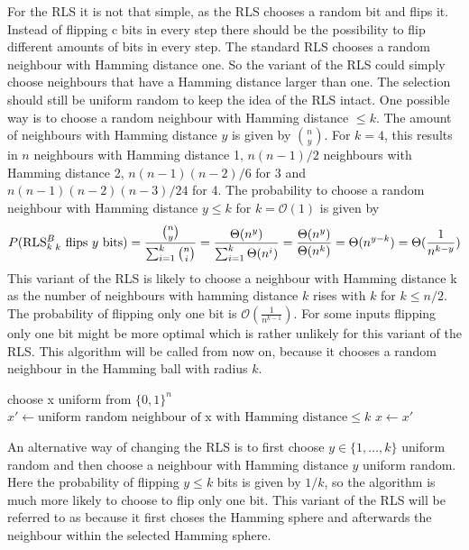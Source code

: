 For the RLS it is not that simple, as the RLS chooses a random bit and flips it.
Instead of flipping c bits in every step there should be the possibility to flip different amounts of bits in every step.
The standard RLS chooses a random neighbour with Hamming distance one.
So the variant of the RLS could simply choose neighbours that have a Hamming distance larger than one.
The selection should still be uniform random to keep the idea of the RLS intact.
One possible way is to choose a random neighbour with Hamming distance $\le k$.
The amount of neighbours with Hamming distance $y$ is given by $\binom{n}{y}$.
For $k=4$, this results in $n$ neighbours with Hamming distance 1, $n(n-1)/2$ neighbours with Hamming distance 2, $n(n-1)(n-2)/6$ for 3
and $n(n-1)(n-2)(n-3)/24$ for 4.
The probability to choose a random neighbour with Hamming distance $y \le k$ for $k = \mathcal{O}(1)$ is given by
\[P(\text{RLS$^{B}_{k}$}_k\text{ flips }y\text{ bits}) = \frac{\binom{n}{y}}{\sum_{i=1}^k \binom{n}{i}} = \frac{\Theta(n^y)}{\sum_{i=1}^k \Theta(n^i)}
      = \frac{\Theta(n^y)}{\Theta(n^k)} = \Theta(n^{y-k}) = \Theta(\frac{1}{n^{k-y}})\]
This variant of the RLS is likely to choose a neighbour with Hamming distance k as the number of neighbours with hamming
distance $k$ rises with $k$ for $k \le n/2$.
The probability of flipping only one bit is $\mathcal{O}(\frac{1}{n^{k-1}})$.
For some inputs flipping only one bit might be more optimal which is rather unlikely for this variant of the RLS.
This algorithm will be called \RLSN[k] from now on, because it chooses a random neighbour in the Hamming ball with radius $k$.
\begin{algorithm}[bt]
      \caption{\textsc{\RLSN}}\label{alg:rlsN}

      \DontPrintSemicolon %

      \BlankLine
      choose x uniform from ${\{0,1\}}^n$\;
      {
      $x' \leftarrow \text{uniform random neighbour of x with Hamming distance} \le k$\;
      {
      {
            $x \leftarrow x'$\;
      }
      }
      }
\end{algorithm}

An alternative way of changing the RLS is to first choose $y \in \{1, \dots, k\}$ uniform random and then choose a neighbour with Hamming distance $y$ uniform random.
Here the probability of flipping $y \le k$ bits is given by $1/k$, so the algorithm is much more likely to choose to flip only one bit.
This variant of the RLS will be referred to as \RLSR[k] because it first choses the Hamming sphere and afterwards the neighbour within the selected Hamming sphere.

